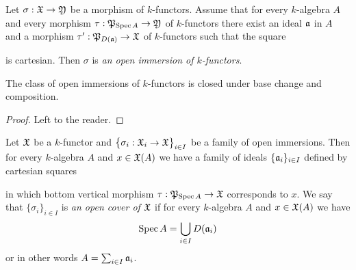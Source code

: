 \begin{definition}
Let $\sigma:{\mathfrak X}\rightarrow {\mathfrak Y}$ be a morphism of $k$-functors. Assume that for every $k$-algebra $A$ and every morphism $\tau:{\mathfrak P}_{\mathrm{Spec}\, A}\rightarrow {\mathfrak Y}$ of $k$-functors there exist an ideal $\mathfrak{a}$ in $A$ and a morphism $\tau':{\mathfrak P}_{D(\mathfrak{a})}\rightarrow {\mathfrak X}$ of $k$-functors such that the square
\begin{center}
\end{center}
is cartesian. Then $\sigma$ is \textit{an open immersion of $k$-functors}.
\end{definition}

\begin{fact}\label{fact:openimmersionsclosedunderbasechangeandcomposition}
The class of open immersions of $k$-functors is closed under base change and composition.
\end{fact}
\begin{proof}
Left to the reader.
\end{proof}

\begin{definition}
Let ${\mathfrak X}$ be a $k$-functor and $\big\{\sigma_i:{\mathfrak X}_i\rightarrow {\mathfrak X}\big\}_{i\in I}$ be a family of open immersions. Then for every $k$-algebra $A$ and $x\in {\mathfrak X}(A)$ we have a family of ideals $\{\mathfrak{a}_i\}_{i\in I}$ defined by cartesian squares
\begin{center}
\end{center}
in which bottom vertical morphism $\tau:{\mathfrak P}_{\mathrm{Spec}\, A}\rightarrow {\mathfrak X}$ corresponds to $x$. We say that $\{\sigma_i\}_{i\in I}$ is \textit{an open cover of ${\mathfrak X}$} if for every $k$-algebra $A$ and $x\in {\mathfrak X}(A)$ we have
$$\mathrm{Spec}\, A = \bigcup_{i\in I}D(\mathfrak{a}_i)$$
or in other words $A = \sum_{i\in I}\mathfrak{a}_i$.
\end{definition}

